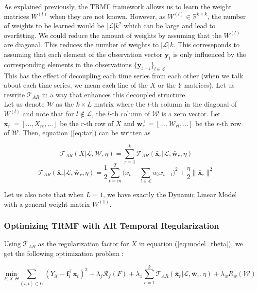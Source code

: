 \documentclass{article}
\begin{document}
As explained previously, the TRMF framework allows us to learn the weight matrices $W^{(l)}$ when they are not known. However, as $W^{(l)} \in \mathbb{R}^{k \times k}$, the number of weights to be learned would be $|\mathcal{L}|k^2$ which can be large and lead to overfitting. We could reduce the amount of weights by assuming that the $W^{(l)}$ are diagonal. This reduces the number of weights to $|\mathcal{L}|k$.
This correseponds to assuming that each element of the observation vector $\mathbf{y}_t$ is only influenced by the corresponding elements in the observations $\{\mathbf{y}_{t-l}\}_{l \in \mathcal{L}}$ \\
This has the effect of decoupling each time series from each other (when we talk about each time series, we mean each line of the $X$ or the $Y$ matrices). Let us rewrite $\mathcal{T}_{AR}$ in a way that enhances this decoupled structure. \\
Let us denote $\mathcal{W}$ as the $k \times L$ matrix where the $l$-th column in the diagonal of $W^{(l)}$ and note that for $l \notin \mathcal{L}$, the $l$-th column of $\mathcal{W}$ is a zero vector.
Let $\bar{\mathbf{x}}_r^{\top} = [..., X_{rt}, ...]$ be the $r$-th row of $X$ and $\bar{\mathbf{w}}_r^{\top} = [..., \mathcal{W}_{rl}, ...]$ be the $r$-th row of $\mathcal{W}$. Then, equation (\ref{eq:tar}) can be written as


$$\mathcal{T}_{AR}(X|\mathcal{L}, \mathcal{W}, \eta) = \sum_{r=1}^k \mathcal{T}_{AR}(\bar{\mathbf{x}}_r|\mathcal{L}, \bar{\mathbf{w}}_r, \eta)$$
$$\mathcal{T}_{AR}(\bar{\mathbf{x}}_r|\mathcal{L}, \bar{\mathbf{w}}_r, \eta) = \frac{1}{2} \sum_{t=m}^T \Big(x_t - \sum_{l \in \mathcal{L}} w_l x_{t-l} \Big)^2 + \frac{\eta}{2} \|\bar{\mathbf{x}}_r\|^2$$

Let us also note that when $L = 1$, we have exactly the Dynamic Linear Model with a general weight matrix $W^{(1)}$.

\subsubsection*{Optimizing TRMF with AR Temporal Regularization}
Using $\mathcal{T}_{AR}$ as the regularization factor for $X$ in equation (\ref{eq:model_theta}), we get the following optimization problem :

\begin{equation}
\underset{F,X,\Theta}{\text{min}} \sum_{(i,t) \in \Omega} (Y_{it} - \mathbf{f}_i^\top\mathbf{x}_t)^2 + \lambda_f \mathcal{R}_f(F) + \lambda_x \sum_{r=1}^k \mathcal{T}_{AR}(\bar{\mathbf{x}}_r|\mathcal{L}, \bar{\mathbf{w}}_r, \eta) + \lambda_{w} R_{w}(\mathcal{W})
\label{eq:model_ar}
\end{equation}
\end{document}
